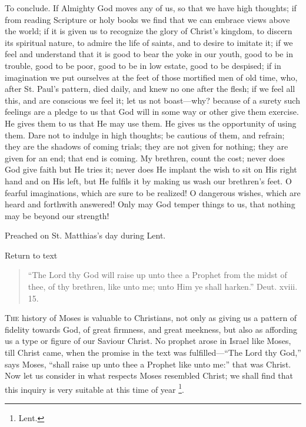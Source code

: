 To conclude. If Almighty God moves any of us, so that we have high
thoughts; if from reading Scripture or holy books we find that we can
embrace views above the world; if it is given us to recognize the
glory of Christ's kingdom, to discern its spiritual nature, to admire
the life of saints, and to desire to imitate it; if we feel and
understand that it is good to bear the yoke in our youth, good to be
in trouble, good to be poor, good to be in low estate, good to be
despised; if in imagination we put ourselves at the feet of those
mortified men of old time, who, after St. Paul's pattern, died daily,
and knew no one after the flesh; if we feel all this, and are
conscious we feel it; let us not boast—why? because of a surety such
feelings are a pledge to us that God will in some way or other give
them exercise. He gives them to us that He may use them. He gives us
the opportunity of using them. Dare not to indulge in high thoughts;
be cautious of them, and refrain; they are the shadows of coming
trials; they are not given for nothing; they are given for an end;
that end is coming. My brethren, count the cost; never does God give
faith but He tries it; never does He implant the wish to sit on His
right hand and on His left, but He fulfils it by making us wash our
brethren's feet. O fearful imaginations, which are sure to be
realized! O dangerous wishes, which are heard and forthwith answered!
Only may God temper things to us, that nothing may be beyond our
strength!


Preached on St. Matthias's day during Lent.

Return to text


\begin{quote}

``The Lord thy God will raise up unto thee a Prophet from the
midst of thee, of thy brethren, like unto me; unto Him ye shall
harken.'' Deut. xviii. 15.

\end{quote}

T\textsc{he} history of Moses is valuable to Christians, not only as giving
us a pattern of fidelity towards God, of great firmness, and great
meekness, but also as affording us a type or figure of our Saviour
Christ. No prophet arose in Israel like Moses, till Christ came, when
the promise in the text was fulfilled—``The Lord thy God,''
says Moses, ``shall raise up unto thee a Prophet like unto
me:'' that was Christ. Now let us consider in what respects Moses
resembled Christ; we shall find that this inquiry is very suitable at
this time of year \footnote{Lent.}.

